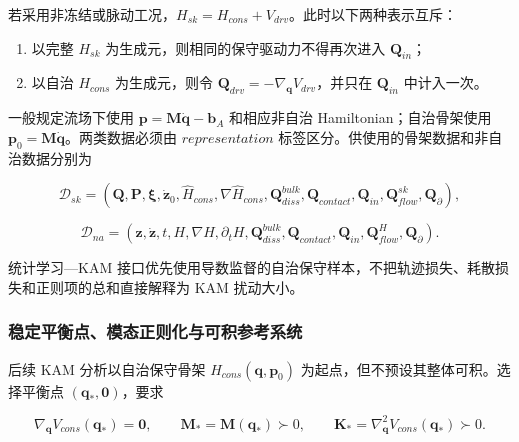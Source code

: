 若采用非冻结或脉动工况，\(H_{sk} = H_{cons} + V_{drv}\)。此时以下两种表示互斥：

\begin{enumerate}
\def\labelenumi{\arabic{enumi}.}
\tightlist
\item
  以完整 \(H_{sk}\) 为生成元，则相同的保守驱动力不得再次进入 \(\mathbf{Q}_{in}\)；
\item
  以自治 \(H_{cons}\) 为生成元，则令 \(\mathbf{Q}_{drv} = - \nabla_{\mathbf{q}}V_{drv}\)，并只在 \(\mathbf{Q}_{in}\) 中计入一次。
\end{enumerate}

一般规定流场下使用 \(\mathbf{p} = \mathbf{M}\dot{\mathbf{q}} - \mathbf{b}_{A}\) 和相应非自治 Hamiltonian；自治骨架使用 \(\mathbf{p}_{0} = \mathbf{M}\dot{\mathbf{q}}\)。两类数据必须由 \(representation\) 标签区分。供使用的骨架数据和非自治数据分别为

\begin{equation}
\label{eq:hamiltonian-3-74}
\mathcal{D}_{sk} = \left( \mathbf{Q},\mathbf{P},\bm{\xi},{\dot{\mathbf{z}}}_{0},{\widehat{H}}_{cons},\nabla{\widehat{H}}_{cons},\mathbf{Q}_{diss}^{bulk},\mathbf{Q}_{contact},\mathbf{Q}_{in},\mathbf{Q}_{flow}^{sk},\mathbf{Q}_{\partial} \right),
\end{equation}

\begin{equation}
\label{eq:hamiltonian-3-75}
\mathcal{D}_{na} = \left( \mathbf{z},\dot{\mathbf{z}},t,H,\nabla H,\partial_{t}H,\mathbf{Q}_{diss}^{bulk},\mathbf{Q}_{contact},\mathbf{Q}_{in},\mathbf{Q}_{flow}^{H},\mathbf{Q}_{\partial} \right).
\end{equation}

统计学习---KAM 接口优先使用导数监督的自治保守样本，不把轨迹损失、耗散损失和正则项的总和直接解释为 KAM 扰动大小\cite{Chen2022KAMSLT}。

\subsubsection{稳定平衡点、模态正则化与可积参考系统}\label{sec:hamiltonian-3-7-3}

后续 KAM 分析以自治保守骨架 \(H_{cons}\left( \mathbf{q},\mathbf{p}_{0} \right)\) 为起点，但不预设其整体可积。选择平衡点 \(\left( \mathbf{q}_{*},\mathbf{0} \right)\)，要求

\begin{equation}
\label{eq:hamiltonian-3-76}
\nabla_{\mathbf{q}}V_{cons}\left( \mathbf{q}_{*} \right) = \mathbf{0},\quad\quad\mathbf{M}_{*} = \mathbf{M}\left( \mathbf{q}_{*} \right) \succ 0,\quad\quad\mathbf{K}_{*} = \nabla_{\mathbf{q}}^{2}V_{cons}\left( \mathbf{q}_{*} \right) \succ 0.
\end{equation}

